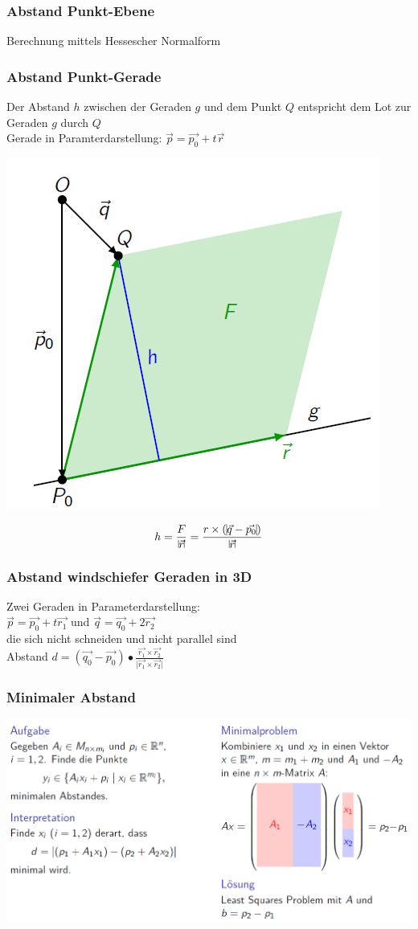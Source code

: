 		\subsubsection{Abstand Punkt-Ebene}
		Berechnung mittels Hessescher Normalform 
		
		
		\subsubsection{Abstand Punkt-Gerade}
		Der Abstand $h$ zwischen der Geraden $g$ und dem Punkt $Q$ entspricht dem Lot zur Geraden $g$ durch $Q$ \\
		Gerade in Paramterdarstellung: $\vec{p} = \vec{p_0} + t \vec{r}$ \\
		 
		 \begin{minipage}{0.45\linewidth}
		 \includegraphics[width=0.6\linewidth]{Bilder/punkt-gerade}
		 \end{minipage}
		\hfill
		\begin{minipage}{0.45\linewidth}
		 $$h = \frac{F}{\vline \vec{r} \vline} =  \frac{r \times ( \vline \vec{q} - \vec{p_0} \vline )}{\vline \vec{r} \vline} $$
		 \end{minipage}

			\subsubsection{Abstand windschiefer Geraden in 3D} 
			Zwei Geraden in Parameterdarstellung:\\					$\vec{p} = \vec{p_0} + t \vec{r_1}$ und $\vec{q} = \vec{q_0} + 2 \vec{r_2}$ \\
			die sich nicht schneiden und nicht parallel sind \\
			
		Abstand $d = (\vec{q_0} -\vec{p_0}) \bullet \frac{\vec{r_1} \times \vec{r_2}}{\vert \vec{r_1} \times \vec{r_2} \vert} $
		
		
		\subsubsection{Minimaler Abstand}
			\includegraphics[width=0.9\linewidth]{Bilder/minimaler-abstand}	
		
		
		
			
		